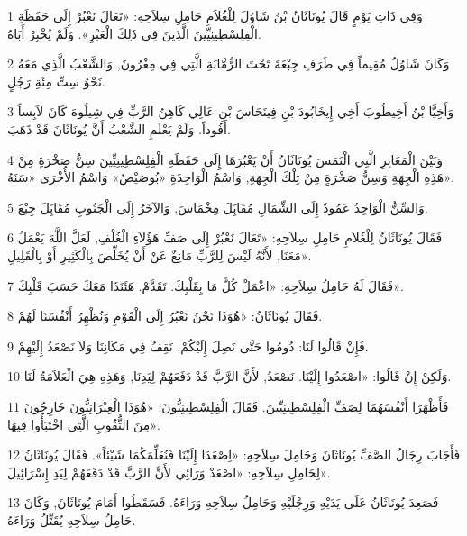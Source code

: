 \par 1 وَفِي ذَاتِ يَوْمٍ قَالَ يُونَاثَانُ بْنُ شَاوُلَ لِلْغُلاَمِ حَامِلِ سِلاَحِهِ: «تَعَالَ نَعْبُرْ إِلَى حَفَظَةِ الْفِلِسْطِينِيِّينَ الَّذِينَ فِي ذَلِكَ الْعَبْرِ». وَلَمْ يُخْبِرْ أَبَاهُ.
\par 2 وَكَانَ شَاوُلُ مُقِيماً فِي طَرَفِ جِبْعَةَ تَحْتَ الرُّمَّانَةِ الَّتِي فِي مِغْرُونَ, وَالشَّعْبُ الَّذِي مَعَهُ نَحْوُ سِتِّ مِئَةِ رَجُلٍ.
\par 3 وَأَخِيَّا بْنُ أَخِيطُوبَ أَخِي إِيخَابُودَ بْنِ فِينَحَاسَ بْنِ عَالِي كَاهِنُ الرَّبِّ فِي شِيلُوهَ كَانَ لاَبِساً أَفُوداً. وَلَمْ يَعْلَمِ الشَّعْبُ أَنَّ يُونَاثَانَ قَدْ ذَهَبَ.
\par 4 وَبَيْنَ الْمَعَابِرِ الَّتِي الْتَمَسَ يُونَاثَانُ أَنْ يَعْبُرَهَا إِلَى حَفَظَةِ الْفِلِسْطِينِيِّينَ سِنُّ صَخْرَةٍ مِنْ هَذِهِ الْجِهَةِ وَسِنُّ صَخْرَةٍ مِنْ تِلْكَ الْجِهَةِ, وَاسْمُ الْوَاحِدَةِ «بُوصَيْصُ» وَاسْمُ الأُخْرَى «سَنَهُ».
\par 5 وَالسِّنُّ الْوَاحِدُ عَمُودٌ إِلَى الشِّمَالِ مُقَابَِلَ مِخْمَاسَ, وَالآخَرُ إِلَى الْجَنُوبِ مُقَابَِلَ جِبْعَ.
\par 6 فَقَالَ يُونَاثَانُ لِلْغُلاَمِ حَامِلِ سِلاَحِهِ: «تَعَالَ نَعْبُرْ إِلَى صَفِّ هَؤُلاَءِ الْغُلْفِ, لَعَلَّ اللَّهَ يَعْمَلُ مَعَنَا, لأَنَّهُ لَيْسَ لِلرَّبِّ مَانِعٌ عَنْ أَنْ يُخَلِّصَ بِالْكَثِيرِ أَوْ بِالْقَلِيلِ».
\par 7 فَقَالَ لَهُ حَامِلُ سِلاَحِهِ: «اعْمَلْ كُلَّ مَا بِقَلْبِكَ. تَقَدَّمْ. هَئَنَذَا مَعَكَ حَسَبَ قَلْبِكَ».
\par 8 فَقَالَ يُونَاثَانُ: «هُوَذَا نَحْنُ نَعْبُرُ إِلَى الْقَوْمِ وَنُظْهِرُ أَنْفُسَنَا لَهُمْ.
\par 9 فَإِنْ قَالُوا لَنَا: دُومُوا حَتَّى نَصِلَ إِلَيْكُمْ. نَقِفُ فِي مَكَانِنَا وَلاَ نَصْعَدُ إِلَيْهِمْ.
\par 10 وَلَكِنْ إِنْ قَالُوا: «اصْعَدُوا إِلَيْنَا. نَصْعَدُ, لأَنَّ الرَّبَّ قَدْ دَفَعَهُمْ لِيَدِنَا, وَهَذِهِ هِيَ الْعَلاَمَةُ لَنَا.
\par 11 فَأَظْهَرَا أَنْفُسَهُمَا لِصَفِّ الْفِلِسْطِينِيِّينَ. فَقَالَ الْفِلِسْطِينِيُّونَ: «هُوَذَا الْعِبْرَانِيُّونَ خَارِجُونَ مِنَ الثُّقُوبِ الَّتِي اخْتَبَأُوا فِيهَا».
\par 12 فَأَجَابَ رِجَالُ الصَّفِّ يُونَاثَانَ وَحَامِلَ سِلاَحِهِ: «اِصْعَدَا إِلَيْنَا فَنُعَلِّمَكُمَا شَيْئاً». فَقَالَ يُونَاثَانُ لِحَامِلِ سِلاَحِهِ: «اصْعَدْ وَرَائِي لأَنَّ الرَّبَّ قَدْ دَفَعَهُمْ لِيَدِ إِسْرَائِيلَ».
\par 13 فَصَعِدَ يُونَاثَانُ عَلَى يَدَيْهِ وَرِجْلَيْهِ وَحَامِلُ سِلاَحِهِ وَرَاءَهُ. فَسَقَطُوا أَمَامَ يُونَاثَانَ, وَكَانَ حَامِلُ سِلاَحِهِ يُقَتِّلُ وَرَاءَهُ.
